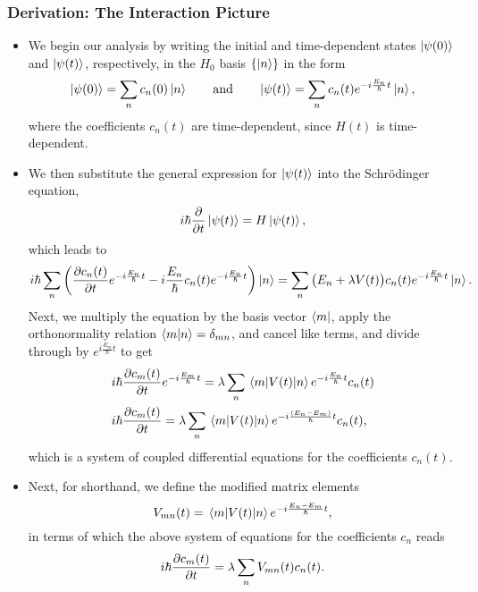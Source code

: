 \documentclass[11pt, a4paper]{article}
\newcommand{\Schro}{Schr\"{o}dinger\xspace}
\newcommand{\p}{\psi}  %
\begin{document}
\subsubsection{Derivation: The Interaction Picture}
\begin{itemize}
    
    \item We begin our analysis by writing the initial and time-dependent states $ \ket{\psi(0)} $ and $ \ket{\psi(t)} $, respectively, in the $ H_{0} $ basis $ \{\ket{n}\} $ in the form
    \begin{equation*}
        \ket{\p(0)} = \sum_{n}c_{n}(0)\ket{n} \qquad \text{and} \qquad \ket{\psi(t)} = \sum_{n}c_{n}(t)e^{-i \frac{E_{n}}{\hbar}t}\ket{n},
    \end{equation*}
    where the coefficients $ c_{n}(t) $ are time-dependent, since $ H(t) $ is time-dependent. 

    \item We then substitute the general expression for $ \ket{\p(t)} $ into the \Schro equation,
    \begin{equation*}
        i \hbar \pdv{t}\ket{\psi(t)} = H \ket{\psi(t)},
    \end{equation*}
    which leads to
    \begin{equation*}
        i \hbar \sum_{n}\left( \pdv{c_{n}(t)}{t}e^{-i \frac{E_{n}}{\hbar}t} - i \frac{E_{n}}{\hbar}c_{n}(t)e^{-i \frac{E_{n}}{\hbar}t} \right)\ket{n} = \sum_{n}\big( E_{n} + \lambda V(t) \big)c_{n}(t)e^{-i \frac{E_{n}}{\hbar}t} \ket{n}.
    \end{equation*}
    Next, we multiply the equation by the basis vector $ \bra{m} $, apply the orthonormality relation $ \braket{m}{n} = \delta_{mn} $, and cancel like terms, and divide through by $ e^{i \frac{E_{m}}{\hbar}t} $ to get
    \begin{align*}
        & i \hbar \pdv{c_{m}(t)}{t}e^{-i \frac{E_{m}}{\hbar}t} = \lambda \sum_{n} \mel{m}{V(t)}{n}e^{-i \frac{E_{n}}{\hbar}t} c_{n}(t)\\
        & i \hbar \pdv{c_{m}(t)}{t} = \lambda \sum_{n} \mel{m}{V(t)}{n}e^{-i \frac{(E_{n} - E_{m})}{\hbar}t} c_{n}(t),
    \end{align*}
    which is a system of coupled differential equations for the coefficients $ c_{n}(t) $. 

    \item Next, for shorthand, we define the modified matrix elements
    \begin{equation*}
        V_{mn}(t) = \mel{m}{V(t)}{n} e^{-i \frac{E_{n} - E_{m}}{\hbar}t},
    \end{equation*}
    in terms of which the above system of equations for the coefficients $ c_{n} $ reads
    \begin{equation*}
        i \hbar \pdv{c_{m}(t)}{t} = \lambda \sum_{n} V_{mn}(t) c_{n}(t).
    \end{equation*}
    

\end{itemize}
\end{document}
